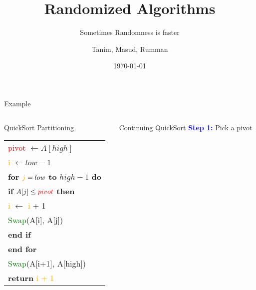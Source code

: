 \documentclass{beamer}
\title{Randomized Algorithms}
\subtitle{Sometimes Randomness is faster}
\author{Tanim, Masud, Rumman}
\date{\today}
\institute{\url{email@some-cool-place.ext}\\\url{http://www.cool-url.com}}
\begin{document}
\begin{frame}[t]{Example}
    \begin{columns}[T]
        \begin{column}{0.55\textwidth}
            \begin{exampleblock}{QuickSort Partitioning}
                \scriptsize
                \begin{tabular}{l}
                    \hspace{0.5cm} \textcolor{red}{pivot} $\gets A[high]$ \\[0.1cm]
                    \hspace{0.5cm} \textcolor{orange}{i} $\gets low - 1$ \\[0.1cm]
                    \hspace{0.5cm} \textbf{for} $\textcolor{orange}{j} = low$ \textbf{to} $high - 1$ \textbf{do} \\[0.1cm]
                    \hspace{1cm} \textbf{if} $A[j] \leq \textcolor{red}{pivot}$ \textbf{then} \\[0.1cm]
                    \hspace{1cm} \textcolor{orange}{i} $\gets$ \textcolor{orange}{i} + 1 \\[0.1cm]
                    \hspace{1cm} \textcolor{green}{Swap}(A[i], A[j]) \\[0.1cm]
                    \hspace{1cm} \textbf{end if} \\[0.1cm]
                    \hspace{0.5cm} \textbf{end for} \\[0.1cm]
                    \hspace{0.5cm} \textcolor{green}{Swap}(A[i+1], A[high]) \\[0.1cm]
                    \hspace{0.5cm} \textbf{return} \textcolor{orange}{i + 1}
                \end{tabular}
            \end{exampleblock}
        \end{column}
        \begin{column}{0.4\textwidth}
            \vspace{.5cm}
            \begin{block}{Continuing QuickSort}
                \scriptsize
                \textbf{\textcolor{blue}{Step 1:}} Pick a pivot \\[0.1cm]

\end{block}
\end{column}
\end{columns}
\end{frame}
\end{document}
